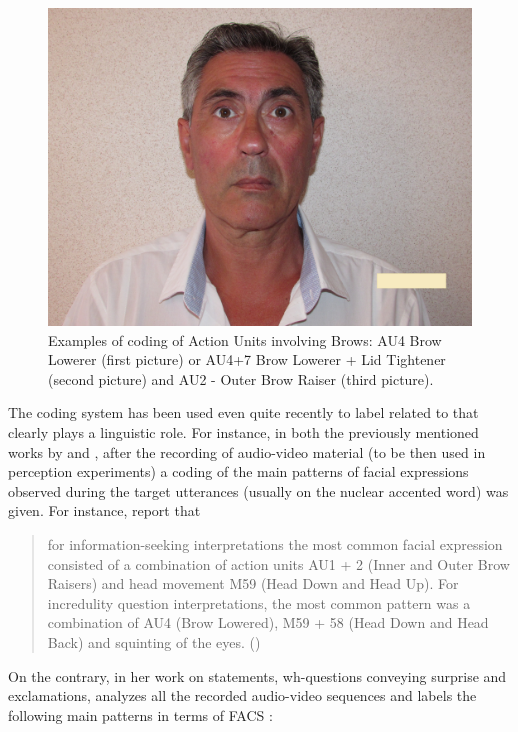 \documentclass[output=paper]{langsci/langscibook}
\begin{document}
\begin{figure}
\includegraphics[height=.3\textheight]{figures/GIL-img8.jpg}
\caption{Examples of coding of Action Units involving Brows: AU4 \textup{Brow Lowerer} (first picture) or AU4+7 \textup{Brow Lowerer} + \textup{Lid Tightener} (second picture) and AU2 - \textup{Outer Brow Raiser (third picture)}.}
\label{fig:gil:4}
\end{figure} 

The coding system has been used even quite recently to label  related to  that clearly plays a linguistic role. For instance, in both the previously mentioned works by \citet{CrespoSendra2013} and \citet{GiliFivela2015informazionimultimodali}, after the recording of audio-video material (to be then used in perception experiments) a coding of the main patterns of facial expressions observed during the target utterances (usually on the nuclear accented word) was given. For instance, \citet[6]{CrespoSendra2013} report that\largerpage

\begin{quote}
for information-seeking interpretations the most common facial expression consisted of a combination of action units AU1 + 2 (Inner and Outer Brow Raisers) and head movement M59 (Head Down and Head Up). For incredulity question interpretations, the most common pattern was a combination of AU4 (Brow Lowered), M59 + 58 (Head Down and Head Back) and squinting of the eyes.
(\citealt[6]{CrespoSendra2013})
\end{quote}

On the contrary, in her work on statements, wh-questions conveying surprise and exclamations, \citet{GiliFivela2015informazionimultimodali} analyzes all the recorded audio-video sequences and labels the following main patterns in terms of FACS : 
\end{document}
